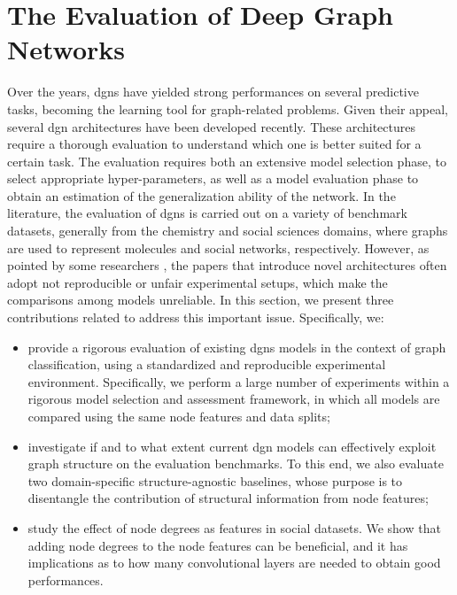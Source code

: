 \section{The Evaluation of Deep Graph Networks}
Over the years, \glspl{dgn} have yielded strong performances on several predictive tasks, becoming the  learning tool for graph-related problems. Given their appeal, several \gls{dgn} architectures have been developed recently. These architectures require a thorough evaluation to understand which one is better suited for a certain task. The evaluation requires both an extensive model selection phase, to select appropriate hyper-parameters, as well as a model evaluation phase to obtain an estimation of the generalization ability of the network. In the literature, the evaluation of \glspl{dgn} is carried out on a variety of benchmark datasets, generally from the chemistry and social sciences domains, where graphs are used to represent molecules and social networks, respectively. However, as pointed by some researchers \cite{?}, the papers that introduce novel architectures often adopt not reproducible or unfair experimental setups, which make the comparisons among models unreliable. In this section, we present three contributions related to address this important issue. Specifically, we:
\begin{itemize}
    \item provide a rigorous evaluation of existing \glspl{dgn} models in the context of graph classification, using a standardized and reproducible experimental environment. Specifically, we perform a large number of experiments within a rigorous model selection and assessment framework, in which all models are compared using the same node features and data splits;
    \item investigate if and to what extent current \gls{dgn} models can effectively exploit graph structure on the evaluation benchmarks. To this end, we also evaluate two domain-specific structure-agnostic baselines, whose purpose is to disentangle the contribution of structural information from node features;
    \item study the effect of node degrees as features in social datasets. We show that adding node degrees to the node features can be beneficial, and it has implications as to how many convolutional layers are needed to obtain good performances.
\end{itemize}

